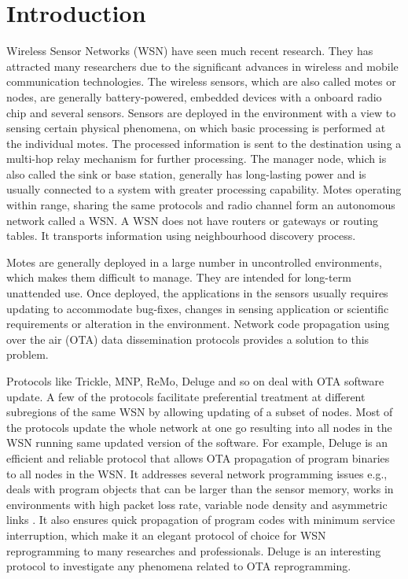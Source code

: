 \documentclass[conference]{IEEEtran}
\begin{document}

\section{Introduction}
\label{sec:intro}
Wireless Sensor Networks (WSN) have seen much recent research.
They has attracted many researchers due to the significant advances in wireless and mobile communication technologies.
The wireless sensors, which are also called motes or nodes, are generally battery-powered, embedded devices with a onboard radio chip and several sensors.
Sensors are deployed in the environment with a view to sensing certain physical phenomena, on which basic processing is performed at the individual motes.
The processed information is sent to the destination using a multi-hop relay mechanism for further processing.
The manager node, which is also called the sink or base station, generally has long-lasting power and is usually connected to a system with greater processing capability.
Motes operating within range, sharing the same protocols and radio channel form an autonomous network called a WSN.
A WSN does not have routers or gateways or routing tables.
It transports information using neighbourhood discovery process.

Motes are generally deployed in a large number in uncontrolled environments, which makes them difficult to manage.
They are intended for long-term unattended use.
Once deployed, the applications in the sensors usually requires updating to accommodate bug-fixes, changes in sensing application or scientific requirements or alteration in the environment.
Network code propagation using over the air (OTA) data dissemination protocols provides a solution to this problem.

Protocols like Trickle, MNP, ReMo, Deluge and so on deal with OTA software update.
A few of the protocols facilitate preferential treatment at different subregions of the same WSN by allowing updating of a subset of nodes.
Most of the protocols update the  whole network at one go resulting into all nodes in the WSN running same updated version of the software.
For example, Deluge is an efficient and reliable protocol that allows OTA propagation of program binaries to all nodes in the WSN.
It addresses several network programming issues e.g., deals with program objects that can be larger than the sensor memory, works in environments with high packet loss rate, variable node density and asymmetric links \cite{1031506}.
It also ensures quick propagation of program codes with minimum service interruption, which make it an elegant protocol of choice for  WSN reprogramming to many researches and professionals.
Deluge is an interesting protocol to investigate any phenomena related to OTA reprogramming.
\end{document}
